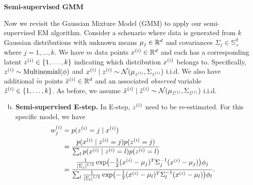 \documentclass[12pt,letterpaper,boxed]{hmcpset}
\newcommand{\ww}{w^{(i)}}
\begin{document}
\begin{solution}
  \noindent \textbf{Semi-supervised GMM}

  \noindent Now we revisit the Gaussian Mixture Model (GMM) to apply our semi-supervised EM algorithm. Consider a schenario where data is generated from $k$ Gaussian distributions with unknown means $\mu_j \in \mathbb{R}^d$ and covariances $\Sigma_j \in \mathbb{S}_+^d$ where $j = 1, \dots, k$. We have $m$ data points $\xx \in \R^d$ and each has a corresponding latent $\zz \in \{1, \dots, k\}$ indicating which distribution $\xx$ belongs to. Specifically, $\zz \sim \text{Multinomial}(\phi)$ and $\xx \mid \zz \sim \mathcal{N}(\mu_{\zz}, \Sigma_{\zz})$ i.i.d. We also have additional $\tilde{m}$ points $\txx \in \R^d$ and an associated \emph{observed} variable $\tzz \in \{1, \dots, k\}$. As before, we assume $\txx \mid \tzz \sim \mathcal{N}(\mu_{\tzz}, \Sigma_{\tzz})$ i.i.d.

  \begin{enumerate}[(a)]
    \setcounter{enumi}{1}
    \item \textbf{Semi-supervised E-step.} In E-step, $\zz$ need to be re-estimated. For this specific model, we have
    \[
    \begin{aligned}
      \ww_j &= p(\zz = j \mid \xx) \\
      &= \frac{p(\xx \mid \zz = j) p(\zz = j)}{\sum_l p(\xx \mid \zz = l)p(\zz = l)} \\
      &= \frac{\frac{1}{\abs{\Sigma_j}^{1/2}} \exp(-\frac{1}{2} (\xx - \mu_j)^T \Sigma_j^{-1} (\xx - \mu_j)) \phi_j}{\sum_l \frac{1}{\abs{\Sigma_l}^{1/2}} \exp(-\frac{1}{2} (\xx - \mu_l)^T \Sigma_l^{-1} (\xx - \mu_l)) \phi_l}.
    \end{aligned}
    \]


\end{enumerate}
\end{solution}
\end{document}
